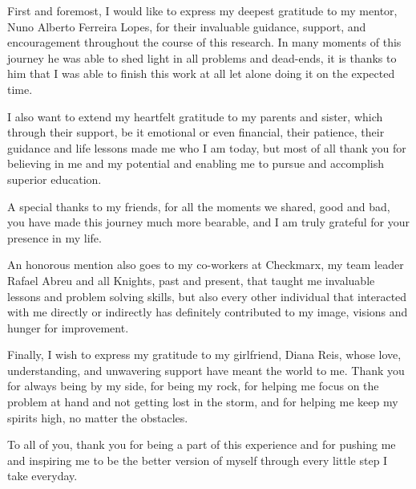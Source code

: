 First and foremost, I would like to express my deepest gratitude to my mentor, Nuno Alberto Ferreira Lopes, for their invaluable guidance, support, and encouragement throughout the course of this research. In many moments of this journey he was able to shed light in all problems and dead-ends, it is thanks to him that I was able to finish this work at all let alone doing it on the expected time.

I also want to extend my heartfelt gratitude to my parents and sister, which through their support, be it emotional or even financial, their patience, their guidance and life lessons made me who I am today, but most of all thank you for believing in me and my potential and enabling me to pursue and accomplish superior education.

A special thanks to my friends, for all the moments we shared, good and bad, you have made this journey much more bearable, and I am truly grateful for your presence in my life.

An honorous mention also goes to my co-workers at Checkmarx, my team leader Rafael Abreu and all Knights, past and present, that taught me invaluable lessons and problem solving skills, but also every other individual that interacted with me directly or indirectly has definitely contributed to my image, visions and hunger for improvement.

Finally, I wish to express my gratitude to my girlfriend, Diana Reis, whose love, understanding, and unwavering support have meant the world to me. Thank you for always being by my side, for being my rock, for helping me focus on the problem at hand and not getting lost in the storm, and for helping me keep my spirits high, no matter the obstacles.

To all of you, thank you for being a part of this experience and for pushing me and inspiring me to be the better version of myself through every little step I take everyday.